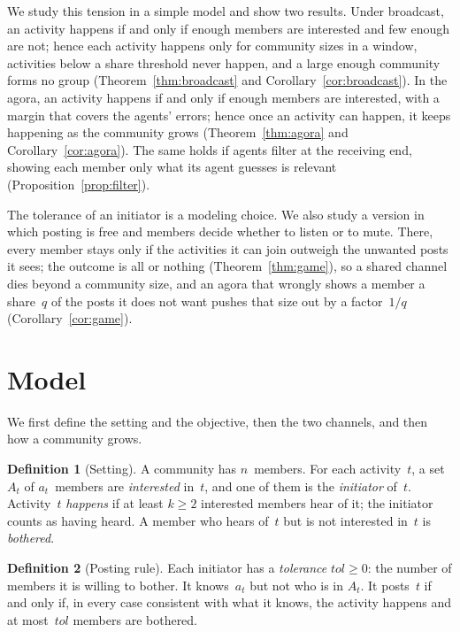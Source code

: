 \documentclass[11pt]{article}
\theoremstyle{definition}
\newtheorem{definition}{Definition}
\newcommand{\tol}{\mathit{tol}}
\begin{document}
We study this tension in a simple model and show two results. Under broadcast, an activity happens if and only if enough members are interested and few enough are not; hence each activity happens only for community sizes in a window, activities below a share threshold never happen, and a large enough community forms no group (Theorem~\ref{thm:broadcast} and Corollary~\ref{cor:broadcast}). In the agora, an activity happens if and only if enough members are interested, with a margin that covers the agents' errors; hence once an activity can happen, it keeps happening as the community grows (Theorem~\ref{thm:agora} and Corollary~\ref{cor:agora}). The same holds if agents filter at the receiving end, showing each member only what its agent guesses is relevant (Proposition~\ref{prop:filter}).

The tolerance of an initiator is a modeling choice. We also study a version in which posting is free and members decide whether to listen or to mute. There, every member stays only if the activities it can join outweigh the unwanted posts it sees; the outcome is all or nothing (Theorem~\ref{thm:game}), so a shared channel dies beyond a community size, and an agora that wrongly shows a member a share~$q$ of the posts it does not want pushes that size out by a factor~$1/q$ (Corollary~\ref{cor:game}).

\section{Model}
We first define the setting and the objective, then the two channels, and then how a community grows.

\begin{definition}[Setting]
A community has $n$~members. For each activity~$t$, a set $A_t$ of $a_t$~members are \emph{interested} in~$t$, and one of them is the \emph{initiator} of~$t$. Activity~$t$ \emph{happens} if at least $k \ge 2$ interested members hear of it; the initiator counts as having heard. A member who hears of~$t$ but is not interested in~$t$ is \emph{bothered}.
\end{definition}

\begin{definition}[Posting rule]
Each initiator has a \emph{tolerance} $\tol \ge 0$: the number of members it is willing to bother. It knows~$a_t$ but not who is in $A_t$. It posts~$t$ if and only if, in every case consistent with what it knows, the activity happens and at most~$\tol$ members are bothered.
\end{definition}
\end{document}
